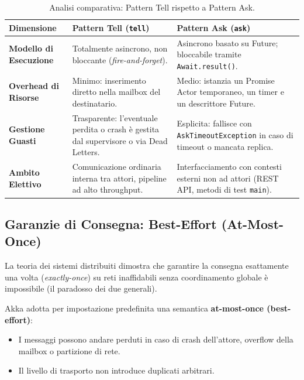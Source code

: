 \begin{table}[htbp]
\centering
\small
\begin{tabularx}{\textwidth}{l X X}
\toprule
\textbf{Dimensione} & \textbf{Pattern Tell (\texttt{tell})} & \textbf{Pattern Ask (\texttt{ask})} \\
\midrule
\textbf{Modello di Esecuzione} & Totalmente asincrono, non bloccante (\textit{fire-and-forget}). & Asincrono basato su Future; bloccabile tramite \texttt{Await.result()}. \\
\midrule
\textbf{Overhead di Risorse} & Minimo: inserimento diretto nella mailbox del destinatario. & Medio: istanzia un Promise Actor temporaneo, un timer e un descrittore Future. \\
\midrule
\textbf{Gestione Guasti} & Trasparente: l'eventuale perdita o crash è gestita dal supervisore o via Dead Letters. & Esplicita: fallisce con \texttt{AskTimeoutException} in caso di timeout o mancata replica. \\
\midrule
\textbf{Ambito Elettivo} & Comunicazione ordinaria interna tra attori, pipeline ad alto throughput. & Interfacciamento con contesti esterni non ad attori (REST API, metodi di test \texttt{main}). \\
\bottomrule
\end{tabularx}
\caption{Analisi comparativa: Pattern Tell rispetto a Pattern Ask.}
\label{tab:tell_vs_ask_it}
\end{table}

\subsection{Garanzie di Consegna: Best-Effort (At-Most-Once)}
La teoria dei sistemi distribuiti dimostra che garantire la consegna esattamente una volta (\textit{exactly-once}) su reti inaffidabili senza coordinamento globale è impossibile (il paradosso dei due generali).

Akka adotta per impostazione predefinita una semantica \textbf{at-most-once (best-effort)}:
\begin{itemize}
    \item I messaggi possono andare perduti in caso di crash dell'attore, overflow della mailbox o partizione di rete.
    \item Il livello di trasporto non introduce duplicati arbitrari.
\end{itemize}

